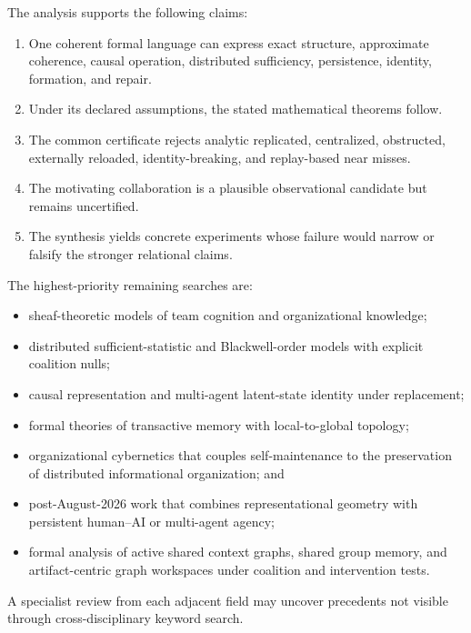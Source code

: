 The analysis supports the following claims:
\begin{enumerate}
\item One coherent formal language can express exact structure, approximate
 coherence, causal operation, distributed sufficiency, persistence,
 identity, formation, and repair.
\item Under its declared assumptions, the stated mathematical theorems follow.
\item The common certificate rejects analytic replicated, centralized,
 obstructed, externally reloaded, identity-breaking, and replay-based
 near misses.
\item The motivating collaboration is a plausible observational candidate but
 remains uncertified.
\item The synthesis yields concrete experiments whose failure would narrow or
 falsify the stronger relational claims.
\end{enumerate}


The highest-priority remaining searches are:
\begin{itemize}
\item sheaf-theoretic models of team cognition and organizational knowledge;
\item distributed sufficient-statistic and Blackwell-order models with
 explicit coalition nulls;
\item causal representation and multi-agent latent-state identity under
 replacement;
\item formal theories of transactive memory with local-to-global topology;
\item organizational cybernetics that couples self-maintenance to the
 preservation of distributed informational organization; and
\item post-August-2026 work that combines representational geometry with
 persistent human--AI or multi-agent agency;
\item formal analysis of active shared context graphs, shared group memory, and
 artifact-centric graph workspaces under coalition and intervention tests.
\end{itemize}
A specialist review from each adjacent field may uncover precedents not visible
through cross-disciplinary keyword search.


